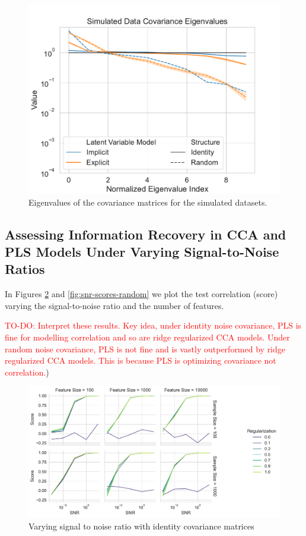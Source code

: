 \begin{figure}
    \centering
    \includegraphics[width=0.8\linewidth]{figures/covariance/simulated_covariance_eigenvalues_low}
    \caption{Eigenvalues of the covariance matrices for the simulated datasets.}\label{fig:covariance-eigenvalues-simulated-low}
\end{figure}


\subsection{Assessing Information Recovery in CCA and PLS Models Under Varying Signal-to-Noise Ratios}

In Figures \ref{fig:snr-scores-identity} and \ref{fig:snr-scores-random} we plot the test correlation (score) varying the signal-to-noise ratio and the number of features.

\textcolor{red}{TO-DO: Interpret these results. Key idea, under identity noise covariance, PLS is fine for modelling correlation and so are ridge regularized CCA models. Under random noise covariance, PLS is not fine and is vastly outperformed by ridge regularized CCA models. This is because PLS is optimizing covariance not correlation.})

\begin{figure}
    \centering
    \includegraphics[width=\linewidth]{figures/brain_behaviour_sim/snr_vs_scores_facet_identity}
    \caption{Varying signal to noise ratio with identity covariance matrices}\label{fig:snr-scores-identity}
\end{figure}

